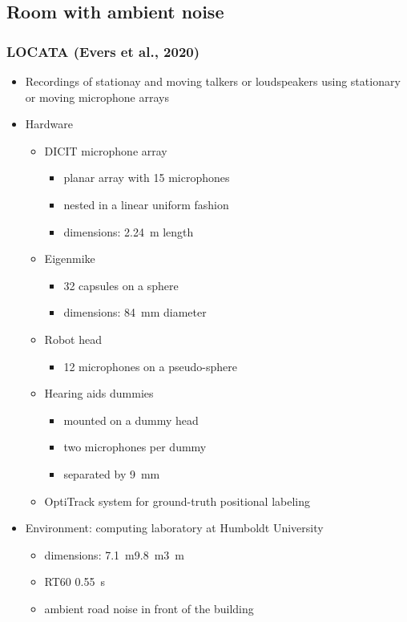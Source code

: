 \documentclass[14pt, oneside]{extarticle}
\begin{document}
\subsection{Room with ambient noise}

\subsubsection{LOCATA (Evers et al., 2020)}

\begin{itemize}

\item Recordings of stationay and moving talkers or loudspeakers using stationary or moving microphone arrays \cite{evers2020data}

\item Hardware
	\begin{itemize}
	\item DICIT microphone array \cite{brutti2010woz}
		\begin{itemize}
		\item planar array with 15 microphones 
		\item nested in a linear uniform fashion	
		\item dimensions: \SI{2.24}{\metre} length
		\end{itemize}
	\item Eigenmike
		\begin{itemize}
		\item 32 capsules on a sphere 
		\item dimensions: \SI{84}{\milli\metre} diameter
		\end{itemize}
	\item Robot head
		\begin{itemize}
		\item 12 microphones on a pseudo-sphere 
		\end{itemize}
	\item Hearing aids dummies
		\begin{itemize}
		\item mounted on a dummy head
		\item two microphones per dummy
		\item separated by \SI{9}{\milli\metre}
		\end{itemize}
	\item OptiTrack system for ground-truth positional labeling
	\end{itemize}

\item Environment: computing laboratory at Humboldt University
	\begin{itemize}
	\item dimensions: \SI{7.1}{\metre}\texttimes\SI{9.8}{\metre}\texttimes\SI{3}{\metre}
	\item RT60 \SI{0.55}{\second} 
	\item ambient road noise in front of the building
	\end{itemize}


\end{itemize}
\end{document}
